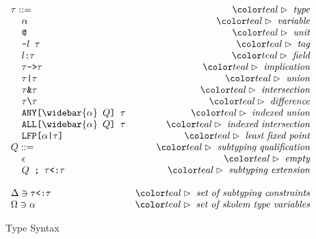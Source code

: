 \documentclass[acmsmall]{acmart}
\theoremstyle{definition}
\begin{document}
\begin{figure*}[h]
\[
\begin{array}[t]{l r}
\tau ::= &\C{type}
  \\
  \I \code{$\alpha$}  &\C{variable}
  \\
  \I \code{@} &\C{unit}
  \\
  \I \code{\textasciitilde{}$l$ $\tau$} &\C{tag}
  \\
  \I \code{$l$:$\tau$} &\C{field}
  \\
  \I \code{$\tau$->$\tau$} &\C{implication}
  \\
  \I \code{$\tau$|$\tau$} &\C{union}
  \\
  \I \code{$\tau$\&$\tau$} &\C{intersection}
  \\
  \I \code{$\tau$\textbackslash$\tau$} &\C{difference}
  \\
  \I \code{ANY[$\widebar{\alpha}$ $Q$] $\tau$} &\C{indexed union}
  \\
  \I \code{ALL[$\widebar{\alpha}$ $Q$] $\tau$} &\C{indexed intersection}
  \\
  \I \code{LFP[$\alpha$|$\tau$]} &\C{least fixed point}
  \\
  Q ::= &\C{subtyping qualification}
  \\
  \I \epsilon &\C{empty}
  \\
  \I \code{$Q$ ; $\tau$<:$\tau$} &\C{subtyping extension}
  \\
  \\
  \Delta \owns \code{$\tau$<:$\tau$} &\C{set of subtyping constraints}
  \\
  \Omega \owns \code{$\alpha$} &\C{set of skolem type variables}
\end{array}
\]
\caption{Type Syntax}
\label{fig:type_syntax}
\end{figure*}
\end{document}

